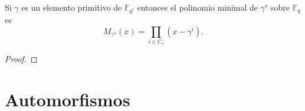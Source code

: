 
\begin{theorem}
  Si \(\gamma\) es un elemento primitivo de \(\mathbb F_{q^t}\) entonces el polinomio minimal de \(\gamma^s\) sobre \(\mathbb F_q\) es
  \[
    M_{\gamma^s}(x) = \prod_{i \in C_s}(x - \gamma^i).
  \]
\end{theorem}

\begin{proof}
\end{proof}

\section{Automorfismos}
